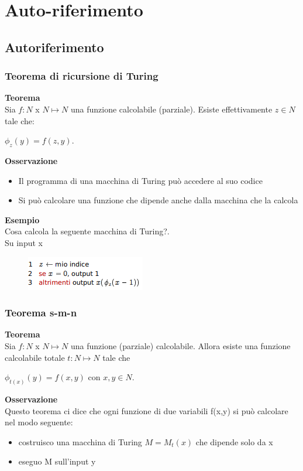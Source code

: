 \chapter{Auto-riferimento} \label{ch:capitolo6}
\section{Autoriferimento}
\subsection{Teorema di ricursione di Turing}
\textbf{Teorema}\\
Sia $f: N $ x $N \mapsto N$ una funzione calcolabile (parziale). Esiste effettivamente $z \in N$ tale che:
\begin{center}
    $\phi_z (y) = f(z,y).$
\end{center}
\textbf{Osservazione}
\begin{itemize}
    \item Il programma di una macchina di Turing può accedere al suo codice
    
    \item Si può calcolare una funzione che dipende anche dalla macchina che la calcola
\end{itemize}
\textbf{Esempio}\\
Cosa calcola la seguente macchina di Turing?.\\
Su input x
\begin{figure}[htp]
    \includegraphics[scale=0.8]{tesi_stile/img/cap6f1.png}
\end{figure}
\subsection{Teorema s-m-n}
\textbf{Teorema}\\
Sia $f : N $ x $N \mapsto N$ una funzione (parziale) calcolabile. Allora esiste una funzione calcolabile totale $t:N \mapsto N$ tale che
\begin{center}
    $\phi_{t(x)} (y)=f(x,y)$ con $x,y \in N.$
\end{center}
\textbf{Osservazione}\\
Questo teorema ci dice che ogni funzione di due variabili f(x,y) si può calcolare nel modo seguente:
\begin{itemize}
    \item costruisco una macchina di Turing $M = M_t(x)$ che dipende solo da x
    
    \item eseguo M sull'input y
\end{itemize}
\newpage
